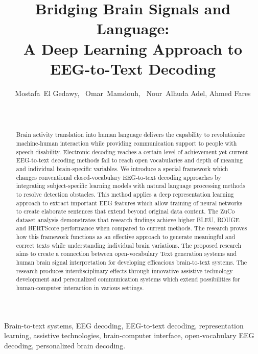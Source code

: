 \documentclass[journal]{IEEEtran}
\begin{document}
\setlength{\parskip}{6pt}
\setlength{\parindent}{0pt}

\title{Bridging Brain Signals and Language: \\ A Deep Learning Approach to EEG-to-Text Decoding}


\author{Mostafa~El Gedawy,~
	Omar~Mamdouh,~
	Nour~Alhuda Adel, Ahmed Fares \\ ~
	\\~
}

\maketitle

\begin{abstract}
	Brain activity translation into human language delivers the capability to revolutionize machine-human interaction while providing communication support to people with speech disability. Electronic decoding reaches a certain level of achievement yet current EEG-to-text decoding methods fail to reach open vocabularies and depth of meaning and individual brain-specific variables. We introduce a special framework which changes conventional closed-vocabulary EEG-to-text decoding approaches by integrating subject-specific learning models with natural language processing methods to resolve detection obstacles. This method applies a deep representation learning approach to extract important EEG features which allow training of neural networks to create elaborate sentences that extend beyond original data content. The ZuCo dataset analysis demonstrates that research findings achieve higher BLEU, ROUGE and BERTScore performance when compared to current methods. The research proves how this framework functions as an effective approach to generate meaningful and correct texts while understanding individual brain variations. The proposed research aims to create a connection between open-vocabulary Text generation systems and human brain signal interpretation for developing efficacious brain-to-text systems. The research produces interdisciplinary effects through innovative assistive technology development and personalized communication systems which extend possibilities for human-computer interaction in various settings.
\end{abstract}

\begin{IEEEkeywords}
	Brain-to-text systems, EEG decoding, EEG-to-text decoding, representation learning, assistive technologies, brain-computer interface, open-vocabulary EEG decoding, personalized brain decoding.
\end{IEEEkeywords}
\end{document}
